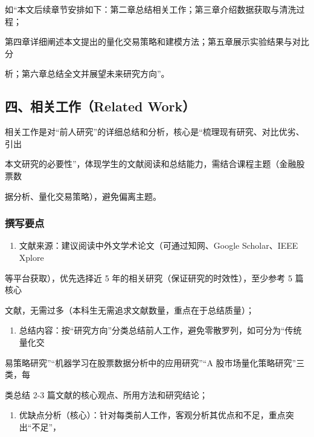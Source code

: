 \documentclass[
]{article}
\providecommand{\tightlist}{%
  \setlength{\itemsep}{0pt}\setlength{\parskip}{0pt}}
\begin{document}
如``本文后续章节安排如下：第二章总结相关工作；第三章介绍数据获取与清洗过程；

第四章详细阐述本文提出的量化交易策略和建模方法；第五章展示实验结果与对比分

析；第六章总结全文并展望未来研究方向''。

\hypertarget{ux56dbux76f8ux5173ux5de5ux4f5crelated-work}{%
\subsection{\texorpdfstring{\textbf{四、相关工作（Related
Work）}}{四、相关工作（Related Work）}}\label{ux56dbux76f8ux5173ux5de5ux4f5crelated-work}}

相关工作是对``前人研究''的详细总结和分析，核心是``梳理现有研究、对比优劣、引出

本文研究的必要性''，体现学生的文献阅读和总结能力，需结合课程主题（金融股票数

据分析、量化交易策略），避免偏离主题。

\hypertarget{ux64b0ux5199ux8981ux70b9}{%
\subsubsection{\texorpdfstring{\textbf{撰写要点}}{撰写要点}}\label{ux64b0ux5199ux8981ux70b9}}

\begin{enumerate}
\def\labelenumi{\arabic{enumi}.}
\tightlist
\item
  文献来源：建议阅读中外文学术论文（可通过知网、Google Scholar、IEEE
  Xplore
\end{enumerate}

等平台获取），优先选择近 5 年的相关研究（保证研究的时效性），至少参考 5
篇核心

文献，无需过多（本科生无需追求文献数量，重点在于总结质量）；

\begin{enumerate}
\def\labelenumi{\arabic{enumi}.}
\setcounter{enumi}{1}
\tightlist
\item
  总结内容：按``研究方向''分类总结前人工作，避免零散罗列，如可分为``传统量化交
\end{enumerate}

易策略研究''``机器学习在股票数据分析中的应用研究''``A
股市场量化策略研究''三类，每

类总结 2-3 篇文献的核心观点、所用方法和研究结论；

\begin{enumerate}
\def\labelenumi{\arabic{enumi}.}
\setcounter{enumi}{2}
\tightlist
\item
  优缺点分析（核心）：针对每类前人工作，客观分析其优点和不足，重点突出``不足''，
\end{enumerate}
\end{document}
